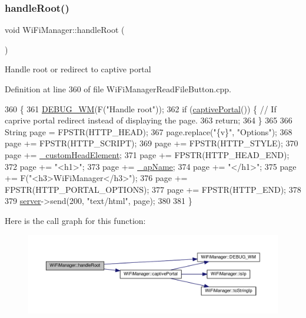 \subsubsection{\texorpdfstring{handle\+Root()}{handleRoot()}}
{\footnotesize\ttfamily void Wi\+Fi\+Manager\+::handle\+Root (\begin{DoxyParamCaption}{ }\end{DoxyParamCaption})\hspace{0.3cm}{\ttfamily [private]}}

Handle root or redirect to captive portal 

Definition at line 360 of file Wi\+Fi\+Manager\+Read\+File\+Button.\+cpp.


\begin{DoxyCode}
360                              \{
361   \hyperlink{class_wi_fi_manager_ae5f595c670ccbcf9a191baf50f5c7c26}{DEBUG\_WM}(F(\textcolor{stringliteral}{"Handle root"}));
362   \textcolor{keywordflow}{if} (\hyperlink{class_wi_fi_manager_a4ef4298deb224212e5242c456669a973}{captivePortal}()) \{ \textcolor{comment}{// If caprive portal redirect instead of displaying the page.}
363     \textcolor{keywordflow}{return};
364   \}
365 
366   String page = FPSTR(HTTP\_HEAD);
367   page.replace(\textcolor{stringliteral}{"\{v\}"}, \textcolor{stringliteral}{"Options"});
368   page += FPSTR(HTTP\_SCRIPT);
369   page += FPSTR(HTTP\_STYLE);
370   page += \hyperlink{class_wi_fi_manager_a8860012564a62209d750c50e56319192}{\_customHeadElement};
371   page += FPSTR(HTTP\_HEAD\_END);
372   page += \textcolor{stringliteral}{"<h1>"};
373   page += \hyperlink{class_wi_fi_manager_a2c27e2f375122254cde4b2fd9ed1e117}{\_apName};
374   page += \textcolor{stringliteral}{"</h1>"};
375   page += F(\textcolor{stringliteral}{"<h3>WiFiManager</h3>"});
376   page += FPSTR(HTTP\_PORTAL\_OPTIONS);
377   page += FPSTR(HTTP\_END);
378 
379   \hyperlink{class_wi_fi_manager_a509523a01c0395cf0dc235b074f2a5ea}{server}->send(200, \textcolor{stringliteral}{"text/html"}, page);
380 
381 \}
\end{DoxyCode}
Here is the call graph for this function\+:\nopagebreak
\begin{figure}[H]
\begin{center}
\leavevmode
\includegraphics[width=350pt]{d4/dc8/class_wi_fi_manager_a47e4c7df7478f690c53ff9f5125c9760_cgraph}
\end{center}
\end{figure}
